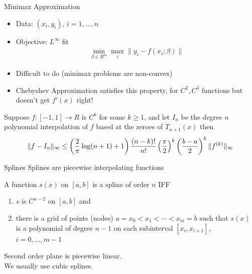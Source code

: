 \documentclass[aspectratio=169,11pt]{beamer}
\begin{document}
\begin{frame}{Minimax Approximation}
\begin{itemize}
\item Data: $(x_i,y_i)$, $i=1,\ldots,n$
\item Objective: $L^{\infty}$ fit
\begin{eqnarray*}
\min_{\beta \in R^m} \max_{i} \| y_i - f(x_i; \beta) \|
\end{eqnarray*}
\item Difficult to do (minimax problems are non-convex)
\item Chebyshev Approximation satisfies this property, for $C^2,C^3$ functions but doesn't get $f'(x)$ right!
\end{itemize}
\begin{theorem}
Suppose $f: [-1,1] \rightarrow R$ is $C^k$ for some $k \geq 1$, and let $I_n$ be the degree $n$ polynomial interpolation of $f$ based at the zeroes of $T_{n+1}(x)$ then
\begin{eqnarray*}
\tiny
\| f - I_n \|_{\infty} \leq \left(\frac{2}{\pi}  \log(n+1) + 1 \right) \frac{(n-k)!}{n!} \left ( \frac{\pi}{2}\right)^k  \left ( \frac{b-a}{2}\right)^k \| f^{(k)} \|_{\infty}
\end{eqnarray*}
\end{theorem}
\end{frame}


\begin{frame}{Splines}
Splines are piecewise interpolating functions
\begin{definition} 
A function $s(x)$ on $[a,b]$ is a spline of order $n$ IFF
\begin{enumerate}
\item $s$ is $C^{n-2}$ on $[a,b]$ and 
\item there is a grid of points (nodes) $a = x_0 < x_1 < \cdots < x_m = b$ such that $s(x)$ is a polynomial of degree $n-1$ on each subinterval $[x_i, x_{i+1}]$, $i = 0,\ldots,m-1$
\end{enumerate}
\end{definition}
Second order plane is piecewise linear.\\
We usually use cubic splines.
\end{frame}
\end{document}
